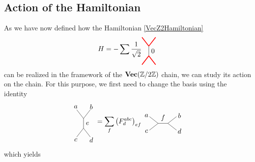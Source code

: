 \subsection{Action of the Hamiltonian}

As we have now defined how the Hamiltonian \eqref{VecZ2Hamiltonian} 
\begin{equation*}
H=-\sum \frac{1}{\sqrt{2}}
\begin{tikzpicture}[scale=0.5,baseline=(current bounding box.center)]
\draw[red,line width=0.4mm] (0,0) -- (-0.7,0.9);
\draw[red,line width=0.4mm] (0,0) -- (0.7,0.9);
\draw (0,0) to node[right] {$0$} (0,-1);
\draw[red,line width=0.4mm] (0,-1) -- (-0.7,-1.9);
\draw[red,line width=0.4mm] (0,-1) -- (0.7,-1.9);
\end{tikzpicture}
\end{equation*}
\noindent
can be realized in the framework of the $\textbf{Vec}(\mathbb{Z}/2\mathbb{Z})$ chain, we can study its action on the chain. For this purpose, we first need to change the basis using the identity
	\begin{equation}
		\begin{tikzpicture}[scale=0.5,baseline=(current bounding box.center)]
			\draw (0,0) -- (-0.7,0.9);
			\draw (0,0) -- (0.7,0.9);
			\draw (0,0) to node[right] {$e$} (0,-1);
			\draw (0,-1) -- (-0.7,-1.9);
			\draw (0,-1) -- (0.7,-1.9);
			\node at (0.8,1.2) {$b$};
			\node at (-0.8,1.2) {$a$};
			\node at (0.8,-2.2) {$d$};
			\node at (-0.8,-2.2) {$c$};
		\end{tikzpicture}=\sum_f\left(F_d^{abc}\right)_{ef}
		\begin{tikzpicture}[scale=0.5,baseline=(current bounding box.center)]
			\draw (0,0) -- (-0.9,0.7);
			\draw (0,0) -- (-0.9,-0.7);
			\draw (0,0) to node[above] {$f$} (1,0);
			\draw (1,0) -- (1.9,0.7);
			\draw (1,0) -- (1.9,-0.7);
			\node at (-1.2,0.8) {$a$};
			\node at (-1.2,-0.8) {$c$};
			\node at (2.2,0.8) {$b$};
			\node at (2.2,-0.8) {$d$};
		\end{tikzpicture}
	\end{equation}
which yields
